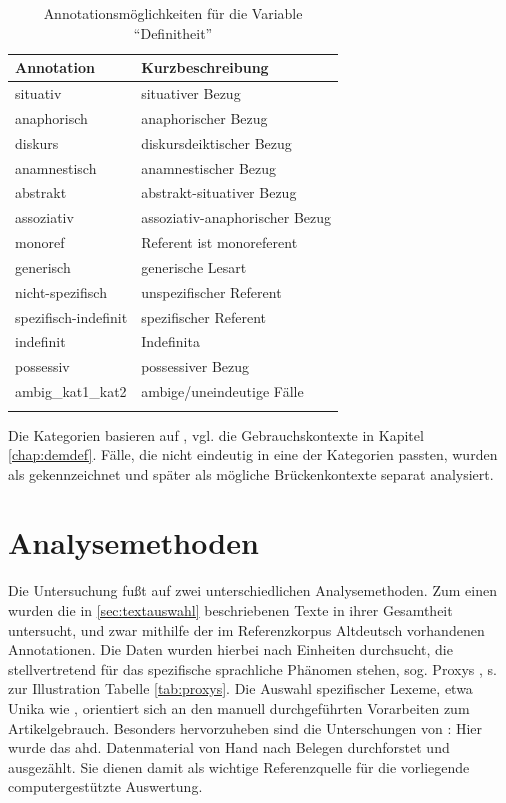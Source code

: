 \begin{table}
\centering
\begin{tabular}{ll}
\lsptoprule
Annotation & Kurzbeschreibung  \\ \midrule
situativ            & situativer Bezug               \\
anaphorisch         & anaphorischer Bezug            \\
diskurs             & diskursdeiktischer Bezug      \\
anamnestisch        & anamnestischer Bezug           \\
abstrakt            & abstrakt-situativer Bezug      \\
assoziativ          & assoziativ-anaphorischer Bezug \\
monoref             & Referent ist monoreferent      \\
generisch           & generische Lesart              \\
nicht-spezifisch        & unspezifischer Referent           \\
spezifisch-indefinit          & spezifischer Referent           \\
indefinit           & Indefinita     \\
possessiv           & possessiver Bezug    \\
ambig\_kat1\_kat2  & ambige/uneindeutige Fälle      \\ \lspbottomrule
\end{tabular}
\caption{Annotationsmöglichkeiten für die Variable \enquote{Definitheit}\label{tab:definitheit}}
\end{table}

Die Kategorien basieren auf \textcite{Lobner1985,Himmelmann1996, Himmelmann1997,Diessel1999,Donhauser2012,Szczepaniak2011a}, vgl. die Gebrauchskontexte in Kapitel \ref{chap:demdef}. Fälle, die nicht eindeutig in eine der Kategorien passten, wurden als  gekennzeichnet und später als mögliche Brückenkontexte separat analysiert. 


\section{Analysemethoden} \label{sec:analysemethoden}

Die Untersuchung fußt auf zwei unterschiedlichen Analysemethoden. Zum einen wurden die in \ref{sec:textauswahl} beschriebenen Texte in ihrer Gesamtheit untersucht, und zwar mithilfe der im Referenzkorpus Altdeutsch vorhandenen Annotationen. Die Daten wurden hierbei nach Einheiten durchsucht, die stellvertretend für das spezifische sprachliche Phänomen stehen, sog. Proxys \parencite[vgl.][114]{Lemnitzer2015}, s. zur Illustration Tabelle \ref{tab:proxys}. Die Auswahl spezifischer Lexeme, etwa Unika wie  , orientiert sich an den manuell durchgeführten Vorarbeiten zum Artikelgebrauch. Besonders hervorzuheben sind die Unterschungen von \textcite{Graf1905,Bell1907,Hodler1954,Oubouzar1989}: Hier wurde das ahd. Datenmaterial von Hand nach Belegen durchforstet und ausgezählt. Sie dienen damit als wichtige Referenzquelle für die vorliegende computergestützte Auswertung. 

